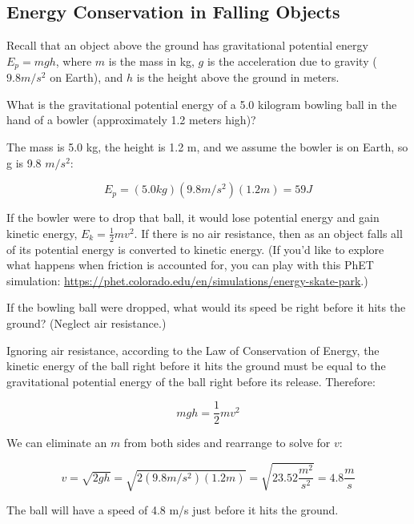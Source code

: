 \subsection{Energy Conservation in Falling Objects}
Recall that an object above the ground has gravitational potential energy
$E_{p} = mgh$, where $m$ is the mass in kg, $g$ is the acceleration due to gravity 
($9.8 m/s^2$ on Earth), and $h$ is the height above the ground in meters.

\begin{Worked}
\begin{Problem}
What is the gravitational potential energy of a 5.0 kilogram
bowling ball in the hand of a bowler (approximately 1.2 meters high)?
\end{Problem}
\begin{Solution}
The mass is 5.0 kg, the height is 1.2 m, and we assume the
bowler is on Earth, so g is 9.8 $m/s^2$:

$$E_{p} = \left( 5.0 kg \right) \left( 9.8 m/s^2 \right) \left( 1.2 m \right) = 59 J$$
\end{Solution}
\end{Worked}

If the bowler were to drop that ball, it would lose potential energy and gain 
kinetic energy, $E_{k} = \frac{1}{2}mv^2$. If there is no air resistance, then as an object falls 
all of its potential energy is converted to kinetic energy. (If you'd like to 
explore what happens when friction is accounted for, you can play with this PhET 
simulation: \url{https://phet.colorado.edu/en/simulations/energy-skate-park}.)

\begin{Worked}
\begin{Problem}
If the bowling ball were dropped, what would its speed be right
before it hits the ground? (Neglect air resistance.)
\end{Problem}
\begin{Solution}
Ignoring air resistance, according to the Law of Conservation
of Energy, the kinetic energy of the ball right before it hits the ground must be 
equal to the gravitational potential energy of the ball right before its release. 
Therefore:

$$mgh = \frac{1}{2}mv^2$$

We can eliminate an $m$ from both sides and rearrange to solve for $v$:

$$v = \sqrt{2gh} = \sqrt{2 \left( 9.8 m/s^2 \right) \left(1.2 m \right)} = 
\sqrt{23.52 \frac{m^2}{s^2}} = 4.8 \frac{m}{s}$$

The ball will have a speed of 4.8 m/s just before it hits the ground. 
\end{Solution}
\end{Worked}

